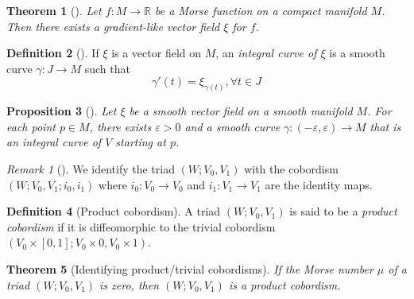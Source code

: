 \documentclass[reqno]{amsart}
\newtheorem{theorem}{Theorem}[section]
\newtheorem{proposition}[theorem]{Proposition}
\theoremstyle{definition}
\newtheorem{definition}[theorem]{Definition}
\theoremstyle{remark}
\newtheorem*{remark}{Remark}
\begin{document}
        \begin{theorem}[]
            Let $f \colon M \to \mathbb{R}$ be a Morse
            function on a compact manifold $M$. Then
            there exists a gradient-like vector field
            $\xi$ for $f$.
        \end{theorem}

        \begin{definition}[]
            If $\xi$ is a vector field on $M$, an
            \textit{integral curve of $\xi$} is a smooth
            curve $\gamma \colon J \to M$ 
            such that
            \[
            \gamma'(t) = \xi_{\gamma(t)}, \forall t \in J
            \] 
        \end{definition}

        \begin{proposition}[]
            \cite[Prop 9.2]{LeeSM}
            Let $\xi$ be a smooth vector field on a smooth
            manifold $M$. For each point $p \in M$, there
            exists $\varepsilon > 0$ and a smooth curve
            $\gamma \colon (-\varepsilon, \varepsilon) \to M$ that
            is an integral curve of $V$ starting at $p$.
        \end{proposition}



        \begin{remark}[]
            We identify the triad
            $\left( W; V_0, V_1 \right) $ with the
            cobordism
            $\left( W; V_0, V_1 ; i_0, i_1 \right) $ where
            $i_0 \colon V_0 \to V_0 $ and
            $i_1 \colon V_1 \to V_1$ are the identity maps.
        \end{remark}

        \begin{definition}[Product cobordism]
            A triad $\left( W; V_0,V_1 \right)  $ is said
            to be a \textit{product cobordism} if it
            is diffeomorphic to the trivial cobordism
            $\left( V_0 \times \left[ 0,1 \right] ; V_0
            \times 0, V_0 \times 1\right) $.
        \end{definition}

        \begin{theorem}[Identifying product/trivial cobordisms]
            If the Morse number $\mu$ of a triad
            $\left( W; V_0, V_1 \right) $ is zero, then
            $\left( W; V_0,V_1 \right) $ is a product cobordism.
        \end{theorem}
\end{document}
